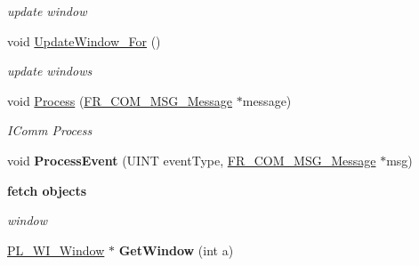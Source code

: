 \begin{DoxyCompactItemize}
\begin{DoxyCompactList}\small\item\em update window \item\end{DoxyCompactList}\item 
\hypertarget{classPlatform_1_1Platform_1_1Platform_a3afcc114f22a2e18ac9aa3c55a2d6304}{
void \hyperlink{classPlatform_1_1Platform_1_1Platform_a3afcc114f22a2e18ac9aa3c55a2d6304}{UpdateWindow\_\-For} ()}
\label{classPlatform_1_1Platform_1_1Platform_a3afcc114f22a2e18ac9aa3c55a2d6304}

\begin{DoxyCompactList}\small\item\em update windows \item\end{DoxyCompactList}\item 
\hypertarget{classPlatform_1_1Platform_1_1Platform_aff3419631c48b1c3bd313675d4eb76a8}{
void \hyperlink{classPlatform_1_1Platform_1_1Platform_aff3419631c48b1c3bd313675d4eb76a8}{Process} (\hyperlink{structFramework_1_1Communication_1_1Message_1_1Message}{FR\_\-COM\_\-MSG\_\-Message} $\ast$message)}
\label{classPlatform_1_1Platform_1_1Platform_aff3419631c48b1c3bd313675d4eb76a8}

\begin{DoxyCompactList}\small\item\em IComm Process \item\end{DoxyCompactList}\item 
\hypertarget{classPlatform_1_1Platform_1_1Platform_a0b32ba2137b32e6531125ec4cff96aa7}{
void {\bfseries ProcessEvent} (UINT eventType, \hyperlink{structFramework_1_1Communication_1_1Message_1_1Message}{FR\_\-COM\_\-MSG\_\-Message} $\ast$msg)}
\label{classPlatform_1_1Platform_1_1Platform_a0b32ba2137b32e6531125ec4cff96aa7}

\end{DoxyCompactItemize}
\begin{Indent}{\bf fetch objects}\par
{\em \label{_amgrpb712734d7b6a37d417e36727149b52a3}
 window }\begin{DoxyCompactItemize}
\item 
\hypertarget{classPlatform_1_1Platform_1_1Platform_a861720c5282be3fabb33663ac0bf0af5}{
\hyperlink{classPlatform_1_1Window_1_1Window}{PL\_\-WI\_\-Window} $\ast$ {\bfseries GetWindow} (int a)}
\label{classPlatform_1_1Platform_1_1Platform_a861720c5282be3fabb33663ac0bf0af5}

\end{DoxyCompactItemize}
\end{Indent}
